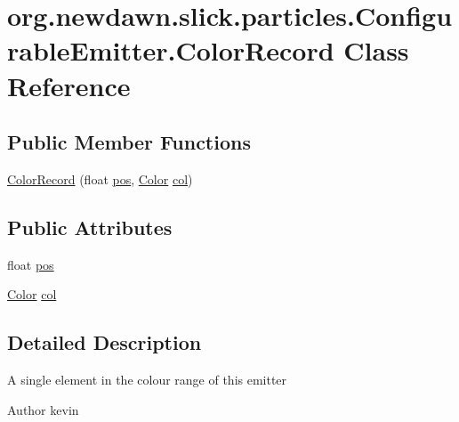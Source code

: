 \hypertarget{classorg_1_1newdawn_1_1slick_1_1particles_1_1_configurable_emitter_1_1_color_record}{}\section{org.\+newdawn.\+slick.\+particles.\+Configurable\+Emitter.\+Color\+Record Class Reference}
\label{classorg_1_1newdawn_1_1slick_1_1particles_1_1_configurable_emitter_1_1_color_record}
\subsection*{Public Member Functions}
\begin{DoxyCompactItemize}
\item 
\mbox{\hyperlink{classorg_1_1newdawn_1_1slick_1_1particles_1_1_configurable_emitter_1_1_color_record_a4b3e46edc3f084bf227cbaa414154b48}{Color\+Record}} (float \mbox{\hyperlink{classorg_1_1newdawn_1_1slick_1_1particles_1_1_configurable_emitter_1_1_color_record_ac171c4542b32bd3f354c91d47621fbbc}{pos}}, \mbox{\hyperlink{classorg_1_1newdawn_1_1slick_1_1_color}{Color}} \mbox{\hyperlink{classorg_1_1newdawn_1_1slick_1_1particles_1_1_configurable_emitter_1_1_color_record_acb7e5871d3350b792a834ddf22c2e145}{col}})
\end{DoxyCompactItemize}
\subsection*{Public Attributes}
\begin{DoxyCompactItemize}
\item 
float \mbox{\hyperlink{classorg_1_1newdawn_1_1slick_1_1particles_1_1_configurable_emitter_1_1_color_record_ac171c4542b32bd3f354c91d47621fbbc}{pos}}
\item 
\mbox{\hyperlink{classorg_1_1newdawn_1_1slick_1_1_color}{Color}} \mbox{\hyperlink{classorg_1_1newdawn_1_1slick_1_1particles_1_1_configurable_emitter_1_1_color_record_acb7e5871d3350b792a834ddf22c2e145}{col}}
\end{DoxyCompactItemize}


\subsection{Detailed Description}
A single element in the colour range of this emitter

\begin{DoxyAuthor}{Author}
kevin 
\end{DoxyAuthor}


